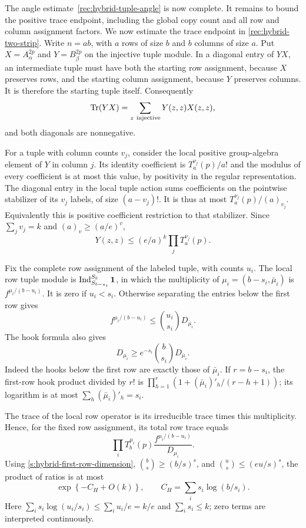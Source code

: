 The angle estimate~\eqref{rec:hybrid-tuple-angle} is now complete.
It remains to bound the positive trace endpoint, including the global
copy count and all row and column assignment factors.
We now estimate the trace endpoint in
\eqref{rec:hybrid-two-strip}. Write $n=ab$, with $a$ rows of size
$b$ and $b$ columns of size $a$. Put
$X=A_\alpha^{2p}$ and $Y=B_\beta^{2p}$ on the injective tuple
module. In a diagonal entry of $YX$, an intermediate tuple must
have both the starting row assignment, because $X$ preserves rows,
and the starting column assignment, because $Y$ preserves columns.
It is therefore the starting tuple itself. Consequently
\[
 \operatorname{Tr}(YX)=\sum_{z\ {\rm injective}}Y(z,z)X(z,z),
\]
and both diagonals are nonnegative.

For a tuple with column counts $v_j$, consider the local positive
group-algebra element of $Y$ in column $j$. Its identity coefficient
is $T_a^{\nu_j}(p)/a!$ and the modulus of every coefficient is at
most this value, by positivity in the regular representation.
The diagonal entry in the local tuple action sums coefficients on
the pointwise stabilizer of its $v_j$ labels, of size $(a-v_j)!$.
It is thus at most $T_a^{\nu_j}(p)/(a)_{v_j}$. Equivalently this
is positive coefficient restriction to that stabilizer.
Since $\sum_jv_j=k$ and $(a)_v\ge(a/e)^v$,
\begin{equation}\label{s:hybrid-tuple-column-diagonal}
 Y(z,z)\le(e/a)^k\prod_jT_a^{\nu_j}(p).
\end{equation}

Fix the complete row assignment of the labeled tuple, with counts
$u_i$. The local row tuple module is
$\operatorname{Ind}_{S_{b-u_i}}^{S_b}{\bf1}$, in which the
multiplicity of $\mu_i=(b-s_i,\bar\mu_i)$ is
$f^{\mu_i/(b-u_i)}$. It is zero if $u_i<s_i$. Otherwise separating
the entries below the first row gives
\[
 f^{\mu_i/(b-u_i)}\le\binom{u_i}{s_i}D_{\bar\mu_i}.
\]
The hook formula also gives
\begin{equation}\label{s:hybrid-first-row-dimension}
 D_{\mu_i}\ge e^{-s_i}\binom b{s_i}D_{\bar\mu_i}.
\end{equation}
Indeed the hooks below the first row are exactly those of
$\bar\mu_i$. If $r=b-s_i$, the first-row hook product divided by
$r!$ is
$\prod_{h=1}^r(1+(\bar\mu_i)'_h/(r-h+1))$; its logarithm is at
most $\sum_h(\bar\mu_i)'_h=s_i$.

The trace of the local row operator is its irreducible trace times
this multiplicity. Hence, for the fixed row assignment, its total
row trace equals
\[
 \prod_i T_b^{\mu_i}(p)
       \frac{f^{\mu_i/(b-u_i)}}{D_{\mu_i}}.
\]
Using \eqref{s:hybrid-first-row-dimension},
$\binom b{s}\ge(b/s)^s$, and
$\binom u{s}\le(eu/s)^s$, the product of ratios is at most
\[
 \exp\left\{-C_H+O(k)\right\},\qquad
 C_H=\sum_i s_i\log(b/s_i).
\]
Here $\sum_i s_i\log(u_i/s_i)\le\sum_i u_i/e=k/e$ and
$\sum_i s_i\le k$; zero terms are interpreted continuously.

